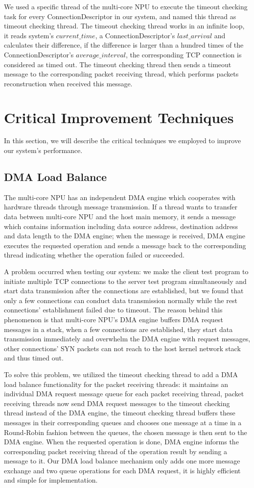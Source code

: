 \documentclass[conference]{IEEEtran}
\begin{document}
We used a specific thread of the multi-core NPU to execute the timeout checking task for every ConnectionDescriptor in our system, and named this thread as timeout checking thread. The timeout checking thread works in an infinite loop, it reads system's $current\_time$, a ConnectionDescriptor's $last\_arrival$ and calculates their difference, if the difference is larger than a hundred times of the ConnectionDescriptor's $average\_interval$, the corresponding TCP connection is considered as timed out. The timeout checking thread then sends a timeout message to the corresponding packet receiving thread, which performs packets reconstruction when received this message.
\section{Critical Improvement Techniques}
In this section, we will describe the critical techniques we employed to improve our system's performance.
\subsection{DMA Load Balance}
The multi-core NPU has an independent DMA engine which cooperates with hardware threads through message transmission. If a thread wants to transfer data between multi-core NPU and the host main memory, it sends a message which contains information including data source address, destination address and data length to the DMA engine; when the message is received, DMA engine executes the requested operation and sends a message back to the corresponding thread indicating whether the operation failed or succeeded.

A problem occurred when testing our system: we make the client test program to initiate multiple TCP connections to the server test program simultaneously and start data transmission after the connections are established, but we found that only a few connections can conduct data transmission normally while the rest connections' establishment failed due to timeout. The reason behind this phenomenon is that multi-core NPU's DMA engine buffers DMA request messages in a stack, when a few connections are established, they start data transmission immediately and overwhelm the DMA engine with request messages, other connections' SYN packets can not reach to the host kernel network stack and thus timed out.

To solve this problem, we utilized the timeout checking thread to add a DMA load balance functionality for the packet receiving threads: it maintains an individual DMA request message queue for each packet receiving thread, packet receiving threads now send DMA request messages to the timeout checking thread instead of the DMA engine, the timeout checking thread buffers these messages in their corresponding queues and chooses one message at a time in a Round-Robin fashion between the queues, the chosen message is then sent to the DMA engine. When the requested operation is done, DMA engine informs the corresponding packet receiving thread of the operation result by sending a message to it. Our DMA load balance mechanism only adds one more message exchange and two queue operations for each DMA request, it is highly efficient and simple for implementation.
\end{document}
